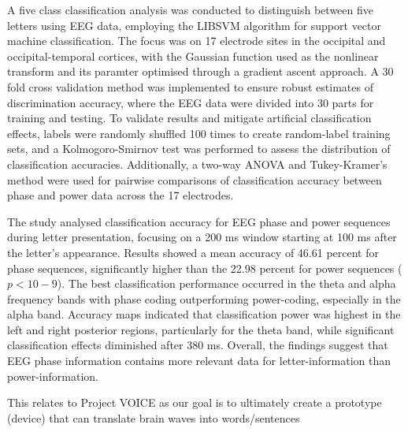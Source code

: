 \documentclass[12pt, research paper]{report}
\begin{document}
	A five class classification analysis was conducted to distinguish between five letters using EEG data, employing the LIBSVM algorithm for support vector machine classification. The focus was on 17 electrode sites in the occipital and occipital-temporal cortices, with the Gaussian function used as the nonlinear transform and its paramter optimised through a gradient ascent approach. A 30 fold cross validation method was implemented to ensure robust estimates of discrimination accuracy, where the EEG data were divided into 30 parts for training and testing. To validate results and mitigate artificial classification effects, labels were randomly shuffled 100 times to create random-label training sets, and a Kolmogoro-Smirnov test was performed to assess the distribution of classification accuracies. Additionally, a two-way ANOVA and Tukey-Kramer's method were used for pairwise comparisons of classification accuracy between phase and power data across the 17 electrodes. 
	
	The study analysed classification accuracy for EEG phase and power sequences during letter presentation, focusing on a 200 ms window starting at 100 ms after the letter's appearance. Results showed a mean accuracy of 46.61 percent for phase sequences, significantly higher than the 22.98 percent for power sequences (\(p < 10-9\)). The best classification performance occurred in the theta and alpha frequency bands with phase coding outperforming power-coding, especially in the alpha band. Accuracy maps indicated that classification power was highest in the left and right posterior regions, particularly for the theta band, while significant classification effects diminished after 380 ms. Overall, the findings suggest that EEG phase information contains more relevant data for letter-information than power-information. 	
	
	This relates to Project VOICE as our goal is to ultimately create a prototype (device) that can translate brain waves into words/sentences 
\end{document}
